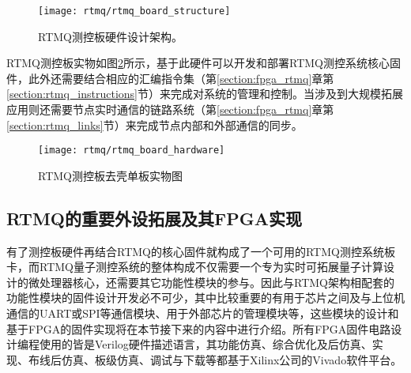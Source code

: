 \begin{figure}
    \centering
    \texttt{[image: rtmq/rtmq\_board\_structure]}
    \caption[RTMQ测控板硬件设计架构]{RTMQ测控板硬件设计架构。\label{fig:rtmq_board_structure}}
\end{figure}



RTMQ测控板实物如图\ref{fig:rtmq_board_hardware}所示，基于此硬件可以开发和部署RTMQ测控系统核心固件，此外还需要结合相应的汇编指令集（第\ref{section:fpga_rtmq}章第\ref{section:rtmq_instructions}节）来完成对系统的管理和控制\cite[]{junhua03}。当涉及到大规模拓展应用则还需要节点实时通信的链路系统（第\ref{section:fpga_rtmq}章第\ref{section:rtmq_links}节）来完成节点内部和外部通信的同步\cite[]{junhua02}。


\begin{figure}
    \centering
    \texttt{[image: rtmq/rtmq\_board\_hardware]}
    \caption[RTMQ测控板去壳单板实物图]{RTMQ测控板去壳单板实物图\label{fig:rtmq_board_hardware}}
\end{figure}

\newpage
\subsection[RTMQ的重要外设拓展及其FPGA实现]{RTMQ的重要外设拓展及其FPGA实现}

有了测控板硬件再结合RTMQ的核心固件就构成了一个可用的RTMQ测控系统板卡，而RTMQ量子测控系统的整体构成不仅需要一个专为实时可拓展量子计算设计的微处理器核心，还需要其它功能性模块的参与。因此与RTMQ架构相配套的功能性模块的固件设计开发必不可少，其中比较重要的有用于芯片之间及与上位机通信的UART或SPI等通信模块、用于外部芯片的管理模块等，这些模块的设计和基于FPGA的固件实现将在本节接下来的内容中进行介绍。所有FPGA固件电路设计编程使用的皆是Verilog硬件描述语言，其功能仿真、综合优化及后仿真、实现、布线后仿真、板级仿真、调试与下载等都基于Xilinx公司的Vivado软件平台。


